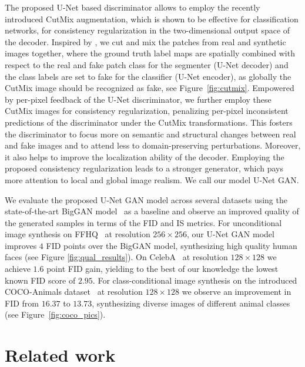 \documentclass[10pt,twocolumn,letterpaper]{article}
\begin{document}
 
The proposed U-Net based discriminator allows to employ the recently introduced CutMix \cite{Yun2019CutMixRS} augmentation, which is shown to be effective for classification networks, for consistency regularization in the two-dimensional output space of the decoder.
Inspired by \cite{Yun2019CutMixRS}, we cut and mix the patches from real and synthetic images together, where the ground truth label maps are spatially combined with respect to the real and fake patch class for the segmenter (U-Net decoder) and the class labels are set to fake for the classifier (U-Net encoder), as globally the CutMix image should be recognized as fake, see Figure~\ref{fig:cutmix}. Empowered by per-pixel feedback of the U-Net discriminator, we further employ these CutMix images for consistency regularization, penalizing per-pixel inconsistent predictions of the discriminator under the CutMix transformations. This fosters the discriminator to focus more on semantic and structural changes between real and fake images and to attend less to domain-preserving perturbations. Moreover, it also helps to improve the localization ability of the decoder. Employing the proposed consistency regularization leads to a stronger generator, which pays more attention to local and global image realism. We call our model U-Net GAN.



We evaluate the proposed U-Net GAN model across several datasets using the state-of-the-art BigGAN model~\cite{Brock2019} as a baseline and observe an improved quality of the generated samples in terms of the FID and IS metrics.
For unconditional image synthesis on FFHQ~\cite{Karras2018ASG} at resolution $256\times256$, our U-Net GAN model improves $4$ FID points over the BigGAN model, synthesizing high quality human faces (see Figure \ref{fig:qual_results}). On CelebA~\cite{Liu_Celeba} at resolution $128\times128$ we achieve $1.6$ point FID gain, yielding to the best of our knowledge the lowest known FID score of $2.95$.
For class-conditional image synthesis on the introduced COCO-Animals dataset~\cite{Lin2014MicrosoftCC,OpenImages} at resolution $128\times128$ we observe an improvement in FID from $16.37$ to $13.73$, synthesizing diverse images of different animal classes (see Figure~\ref{fig:coco_pics}).


 
\section{Related work}\label{related_work}
\end{document}
